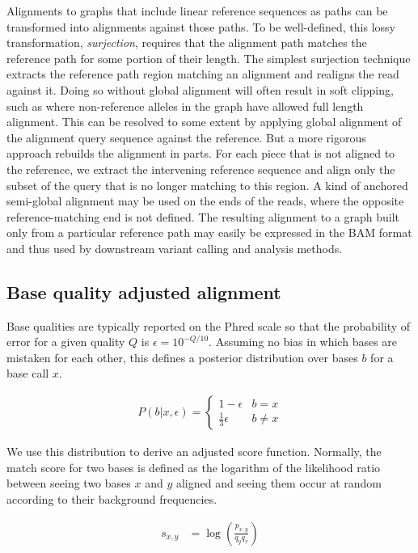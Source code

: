 Alignments to graphs that include linear reference sequences as paths can be transformed into alignments against those paths.
To be well-defined, this lossy transformation, \emph{surjection}, requires that the alignment path matches the reference path for some portion of their length.
The simplest surjection technique extracts the reference path region matching an alignment and realigns the read against it.
Doing so without global alignment will often result in soft clipping, such as where non-reference alleles in the graph have allowed full length alignment.
This can be resolved to some extent by applying global alignment of the alignment query sequence against the reference.
But a more rigorous approach rebuilds the alignment in parts.
For each piece that is not aligned to the reference, we extract the intervening reference sequence and align only the subset of the query that is no longer matching to this region.
A kind of anchored semi-global alignment may be used on the ends of the reads, where the opposite reference-matching end is not defined.
The resulting alignment to a graph built only from a particular reference path may easily be expressed in the BAM format and thus used by downstream variant calling and analysis methods.

\subsection{Base quality adjusted alignment}

Base qualities are typically reported on the Phred scale so that the probability of error for a given quality $Q$ is $\epsilon = 10^{-Q/10}$. Assuming no bias in which bases are mistaken for each other, this defines a posterior distribution over bases $b$ for a base call $x$.

\begin{align}
    P(b|x, \epsilon) = \begin{cases}
        1 - \epsilon & b = x \\
        \frac{1}{3} \epsilon & b \neq x
    \end{cases}
\end{align}

We use this distribution to derive an adjusted score function. Normally, the match score for two bases is defined as the logarithm of the likelihood ratio between seeing two bases $x$ and $y$ aligned and seeing them occur at random according to their background frequencies. 

\begin{align}
    s_{x,y} &= \log\left(\frac{p_{x,y}}{q_y q_x} \right) \label{eqn:base_score}
\end{align}

